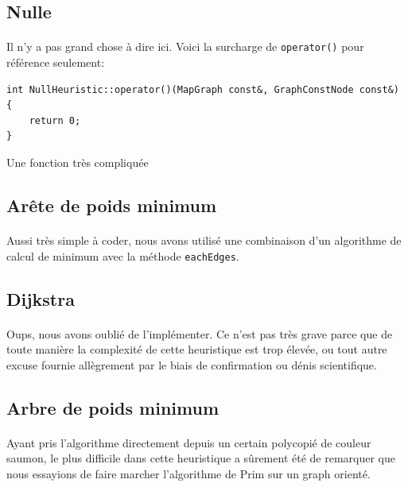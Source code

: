 \documentclass[french]{article}
\begin{document}
\subsection{Nulle}

\paragraph{} Il n'y a pas grand chose à dire ici. Voici la surcharge de
\texttt{operator()} pour référence seulement:

\begin{listing}[H]
\begin{verbatim}
int NullHeuristic::operator()(MapGraph const&, GraphConstNode const&) {
	return 0;
}
\end{verbatim}
\caption{Une fonction très compliquée}
\label{tsp:nulloperator}
\end{listing}

\subsection{Arête de poids minimum}

\paragraph{} Aussi très simple à coder, nous avons utilisé une combinaison d'un
algorithme de calcul de minimum avec la méthode \texttt{eachEdges}.

\subsection{Dijkstra}

\paragraph{} Oups, nous avons oublié de l'implémenter. Ce n'est pas très grave
parce que de toute manière la complexité de cette heuristique est trop élevée,
ou tout autre excuse fournie allègrement par le biais de confirmation ou dénis
scientifique.

\subsection{Arbre de poids minimum}

\paragraph{} Ayant pris l'algorithme directement depuis un certain polycopié de
couleur saumon, le plus difficile dans cette heuristique a sûrement été de
remarquer que nous essayions de faire marcher l'algorithme de Prim sur un graph
orienté.
\end{document}
